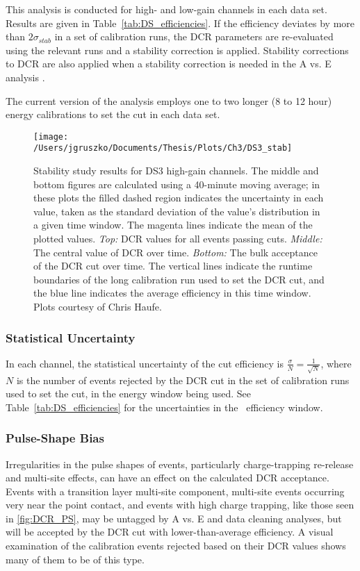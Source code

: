 This analysis is conducted for high- and low-gain channels in each data set. Results are given in Table~\ref{tab:DS_efficiencies}. If the efficiency deviates by more than $2\sigma_{stab}$ in a set of calibration runs, the DCR parameters are re-evaluated using the relevant runs and a stability correction is applied. Stability corrections to DCR are also applied when a stability correction is needed in the A vs. E analysis \cite{AvsE_unidoc}.

The current version of the analysis employs one to two longer (8 to 12 hour) energy calibrations to set the cut in each data set. 

\begin{sidewaysfigure}[]
 \centering
 \texttt{[image: /Users/jgruszko/Documents/Thesis/Plots/Ch3/DS3\_stab]}
 \caption[DCR stability study results in DS3 high-gain channels]{Stability study results for DS3 high-gain channels. The middle and bottom figures are calculated using a 40-minute moving average; in these plots the filled dashed region indicates the uncertainty in each value, taken as the standard deviation of the value's distribution in a given time window. The magenta lines indicate the mean of the plotted values. {\it Top:} DCR values for all events passing cuts. {\it Middle:} The central value of DCR over time. {\it Bottom:} The bulk acceptance of the DCR cut over time. The vertical lines indicate the runtime boundaries of the long calibration run used to set the DCR cut, and the blue line indicates the average efficiency in this time window. Plots courtesy of Chris Haufe.} 
 \label{fig:DS3_stab}
\end{sidewaysfigure}


\subsubsection{Statistical Uncertainty}
In each channel, the statistical uncertainty of the cut efficiency is $\frac{\sigma}{N} = \frac{1}{\sqrt{N}}$, where $N$ is the number of events rejected by the DCR cut in the set of calibration runs used to set the cut, in the energy window being used. See Table~\ref{tab:DS_efficiencies} for the uncertainties in the \nonubb\ efficiency window.

\subsubsection{Pulse-Shape Bias}
Irregularities in the pulse shapes of events, particularly charge-trapping re-release and multi-site effects, can have an effect on the calculated DCR acceptance. Events with a transition layer multi-site component, multi-site events occurring very near the point contact, and events with high charge trapping, like those seen in \ref{fig:DCR_PS}, may be untagged by A vs. E and data cleaning analyses, but will be accepted by the DCR cut with lower-than-average efficiency. A visual examination of the calibration events rejected based on their DCR values shows many of them to be of this type.

